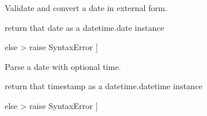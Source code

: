 \documentclass[letterpaper,10pt,english]{sphinxmanual}
\begin{document}
\begin{fulllineitems}
\label{\detokenize{api/killMS.Data:killMS.Data.sidereal.parseDate}}
\pysigstartsignatures
{}
\pysigstopsignatures
\sphinxAtStartPar
Validate and convert a date in external form.
\begin{description}
\sphinxlineitem{{[} s is a string \sphinxhyphen{}\textgreater{}}\begin{description}
\sphinxAtStartPar
return that date as a datetime.date instance

\end{description}

\sphinxAtStartPar
else \sphinxhyphen{}\textgreater{} raise SyntaxError {]}

\end{description}
\begin{quote}\begin{description}
\sphinxAtStartPar
{}

\end{description}\end{quote}

\end{fulllineitems}


\begin{fulllineitems}
\label{\detokenize{api/killMS.Data:killMS.Data.sidereal.parseDatetime}}
\pysigstartsignatures
{}
\pysigstopsignatures
\sphinxAtStartPar
Parse a date with optional time.
\begin{description}
\sphinxlineitem{{[} s is a string \sphinxhyphen{}\textgreater{}}\begin{description}
\sphinxAtStartPar
return that timestamp as a datetime.datetime instance

\end{description}

\sphinxAtStartPar
else \sphinxhyphen{}\textgreater{} raise SyntaxError {]}

\end{description}
\begin{quote}\begin{description}
\sphinxAtStartPar
{}

\end{description}\end{quote}

\end{fulllineitems}
\end{document}
